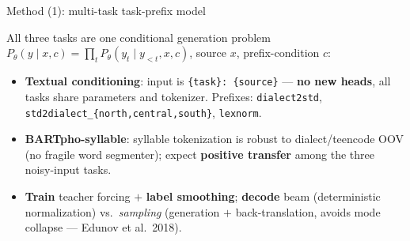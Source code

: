 \documentclass[aspectratio=169,11pt]{beamer}
\newcommand{\hl}[1]{\textcolor{oiblue}{\textbf{#1}}}
\newcommand{\tprefix}[1]{\texttt{\small #1}}
\begin{document}
\begin{frame}{Method (1): multi-task task-prefix model}
  \centering
  \vspace{0.2em}
  All three tasks are one conditional generation problem $P_\theta(y\mid x,c)=\prod_{t}P_\theta(y_t\mid y_{<t},x,c)$, source $x$, prefix-condition $c$:
  \begin{itemize}\small
    \item \hl{Textual conditioning}: input is \texttt{\{task\}: \{source\}} --- \hl{no new heads}, all tasks share parameters and tokenizer. Prefixes: \tprefix{dialect2std}, \tprefix{std2dialect\_\{north,central,south\}}, \tprefix{lexnorm}.
    \item \hl{BARTpho-syllable}: syllable tokenization is robust to dialect/teencode OOV (no fragile word segmenter); expect \hl{positive transfer} among the three noisy-input tasks.
    \item \hl{Train} teacher forcing $+$ \hl{label smoothing}; \hl{decode} beam (deterministic normalization) vs.\ \emph{sampling} (generation $+$ back-translation, avoids mode collapse --- Edunov et al.\ 2018).
  \end{itemize}
\end{frame}
\end{document}
